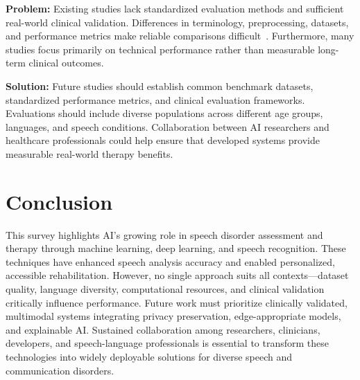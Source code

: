 \documentclass[conference]{IEEEtran}
\begin{document}
\textbf{Problem:} Existing studies lack standardized evaluation methods and sufficient real-world clinical validation. Differences in terminology, preprocessing, datasets, and performance metrics make reliable comparisons difficult~\cite{ref1,ref13,ref15,ref19}. Furthermore, many studies focus primarily on technical performance rather than measurable long-term clinical outcomes.

\textbf{Solution:} Future studies should establish common benchmark datasets, standardized performance metrics, and clinical evaluation frameworks. Evaluations should include diverse populations across different age groups, languages, and speech conditions. Collaboration between AI researchers and healthcare professionals could help ensure that developed systems provide measurable real-world therapy benefits.


\section{Conclusion}

This survey highlights AI's growing role in speech disorder assessment and therapy through machine learning, deep learning, and speech recognition. These techniques have enhanced speech analysis accuracy and enabled personalized, accessible rehabilitation. However, no single approach suits all contexts---dataset quality, language diversity, computational resources, and clinical validation critically influence performance. Future work must prioritize clinically validated, multimodal systems integrating privacy preservation, edge-appropriate models, and explainable AI. Sustained collaboration among researchers, clinicians, developers, and speech-language professionals is essential to transform these technologies into widely deployable solutions for diverse speech and communication disorders.
\end{document}
